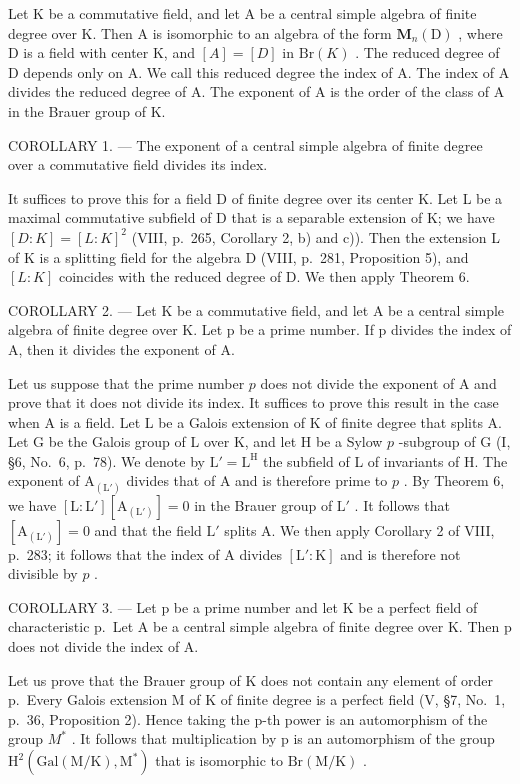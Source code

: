 Let K be a commutative field, and let A be a central simple algebra of finite degree over K. Then A is isomorphic to an algebra of the form \(\mathbf{M}_{n}(\mathrm{D})\) , where D is a field with center K, and \([A]=[D]\) in \(\mathrm{Br}(K)\) . The reduced degree of D depends only on A. We call this reduced degree the index of A. The index of A divides the reduced degree of A. The exponent of A is the order of the class of A in the Brauer group of K.

COROLLARY 1. --- The exponent of a central simple algebra of finite degree over a commutative field divides its index.

It suffices to prove this for a field D of finite degree over its center K. Let L be a maximal commutative subfield of D that is a separable extension of K; we have \([D:K]=[L:K]^{2}\) (VIII, p.~265, Corollary 2, b) and c)). Then the extension L of K is a splitting field for the algebra D (VIII, p.~281, Proposition 5), and \([L:K]\) coincides with the reduced degree of D. We then apply Theorem 6.

COROLLARY 2. --- Let K be a commutative field, and let A be a central simple algebra of finite degree over K. Let p be a prime number. If p divides the index of A, then it divides the exponent of A.

Let us suppose that the prime number \(p\) does not divide the exponent of A and prove that it does not divide its index. It suffices to prove this result in the case when A is a field. Let L be a Galois extension of K of finite degree that splits A. Let G be the Galois group of L over K, and let H be a Sylow \(p\) -subgroup of G (I, §6, No.~6, p.~78). We denote by \(\mathrm{L}' = \mathrm{L}^{\mathrm{H}}\) the subfield of L of invariants of H. The exponent of \(\mathrm{A}_{(\mathrm{L}')}\) divides that of A and is therefore prime to \(p\) . By Theorem 6, we have \([\mathrm{L}:\mathrm{L}'][\mathrm{A}_{(\mathrm{L}')}] = 0\) in the Brauer group of \(\mathrm{L}'\) . It follows that \([\mathrm{A}_{(\mathrm{L}')}] = 0\) and that the field \(\mathrm{L}'\) splits A. We then apply Corollary 2 of VIII, p.~283; it follows that the index of A divides \([\mathrm{L}':\mathrm{K}]\) and is therefore not divisible by \(p\) .

COROLLARY 3. --- Let p be a prime number and let K be a perfect field of characteristic p.~Let A be a central simple algebra of finite degree over K. Then p does not divide the index of A.

Let us prove that the Brauer group of K does not contain any element of order p.~Every Galois extension M of K of finite degree is a perfect field (V, §7, No.~1, p.~36, Proposition 2). Hence taking the p-th power is an automorphism of the group \(M^{*}\) . It follows that multiplication by p is an automorphism of the group \(\mathrm{H}^{2}(\mathrm{Gal}(\mathrm{M}/\mathrm{K}),\mathrm{M}^{*})\) that is isomorphic to \(\mathrm{Br}(\mathrm{M}/\mathrm{K})\) .

